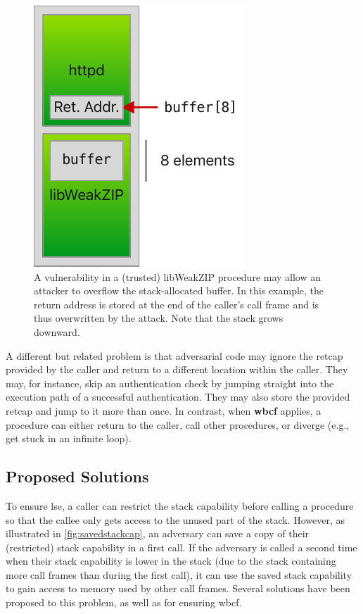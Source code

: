 \documentclass[main.tex]{subfiles}
\begin{document}
\begin{figure}
	\begin{center}
		\includegraphics{Images/Buffer Overflow.pdf}
	\end{center}
	\caption{A vulnerability in a (trusted) libWeakZIP procedure may allow an attacker to overflow the stack-allocated buffer. In this example, the return address is stored at the end of the caller's call frame and is thus overwritten by the attack. Note that the stack grows downward.}
	\label{fig:buffoverflow}
\end{figure}

A different but related problem is that adversarial code may ignore the \gls{retcap} provided by the caller and return to a different location within the caller. They may, for instance, skip an authentication check by jumping straight into the execution path of a successful authentication. They may also store the provided \gls{retcap} and jump to it more than once. In contrast, when \textbf{\gls{wbcf}} applies, a procedure can either return to the caller, call other procedures, or diverge (e.g., get stuck in an infinite loop).

\subsection*{Proposed Solutions}
To ensure \gls{lse}, a caller can restrict the stack capability before calling a procedure so that the callee only gets access to the unused part of the stack. However, as illustrated in \cref{fig:savedstackcap}, an adversary can save a copy of their (restricted) stack capability in a first call. If the adversary is called a second time when their stack capability is lower in the stack (due to the stack containing more call frames than during the first call), it can use the saved stack capability to gain access to memory used by other call frames. Several solutions have been proposed to this problem, as well as for ensuring \gls{wbcf}.
\end{document}
